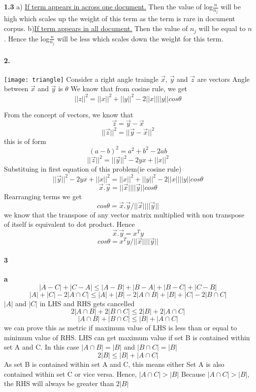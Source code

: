 \documentclass{article}
\begin{document}
\textbf{1.3}\newline
a) \underline{If term appears in across one document.}\newline
Then the value of log$\frac{n}{n_{j}}$ will be high which scales up the weight of this term as the term is rare in document corpus.\newline
b)\underline{If term appears in all document.}\newline
Then the value of $n_{j}$ will be equal to $n$. Hence the log$\frac{n}{n_{j}}$ will be less which scales down the weight for this term.

\paragraph{2.}
\texttt{[image: triangle]}
Consider a right angle traingle\newline
$\vec{x}$, $\vec{y}$ and $\vec{z}$ are vectors\newline
Angle between $\vec{x}$ and $\vec{y}$ is $\theta$\newline
We know that from cosine rule, we get\newline
$$||z||^2 = ||x||^2 + ||y||^2-2||x||||y||cos\theta$$

From the concept of vectors, we know that
$$\vec{z} = \vec{y}-\vec{x}$$
$$||\vec{z}||^2 = ||\vec{y}-\vec{x}||^2$$
this is of form $$(a-b)^2 = a^2+b^2-2ab$$
$$||\vec{z}||^2 = ||\vec{y}||^2-2yx+||x||^2$$
Substituing in first equation of this problem(ie cosine rule)
$$||\vec{y}||^2-2yx+||x||^2 = ||x||^2 + ||y||^2-2||x||||y||cos\theta$$
$$\vec{x}.\vec{y} = ||\vec{x}||||\vec{y}||cos\theta$$
Rearranging terms we get
$$cos\theta = \vec{x}.\vec{y}/||\vec{x}||||\vec{y}||$$
we know that the transpose of any vector matrix multiplied with non transpose of itself is equivalent to dot product.\newline
Hence $$\vec{x}.\vec{y} = x^{T}y$$
$$cos\theta = x^{T}y/||\vec{x}||||\vec{y}||$$

\paragraph{3}
\textbf{a}\newline
$$|A-C|+|C-A| \leq |A-B|+|B-A| + |B-C|+|C-B|$$
$$|A|+|C|-2|A \cap C| \leq |A|+|B|-2|A \cap B| + |B|+|C|-2|B \cap C|$$
$|A|$ and $|C|$ in LHS and RHS gets cancelled
$$2|A \cap B|+2|B \cap C| \leq 2|B| + 2|A \cap C|$$
$$|A \cap B|+|B \cap C| \leq |B| + |A \cap C|$$
we can prove this as metric if maximum value of LHS is less than or equal to minimum value of RHS.\newline
LHS can get maximum value if set B is contained within set A and C. In this case $|A \cap B| = |B|$ and $|B \cap C| = |B|$
$$2|B|\leq|B|+|A\cap C|$$
As set B is contained within set A and C, this means either Set A is also contained within set C or vice versa. Hence, $|A\cap C| > |B|$\newline
Because $|A\cap C|>|B|$, the RHS will always be greater than $2|B|$\newline
\end{document}
